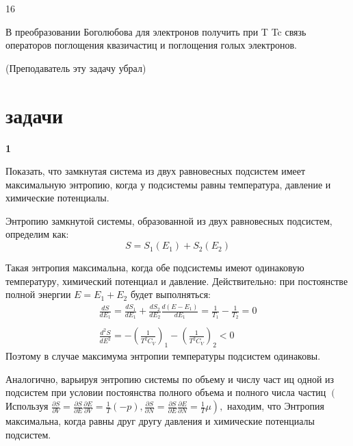\documentclass[a4paper,12pt]{article} %
\begin{document}
\begin{task}

16

В преобразовании Боголюбова для электронов получить при T  Tc связь операторов поглощения квазичастиц и поглощения голых электронов.

(Преподаватель эту задачу убрал)












\end{task}



















\clearpage
\part{задачи}



\begin{ttask}\textbf{1}


Показать, что замкнутая система из двух равновесных подсистем имеет максимальную энтропию, 
когда у подсистемы равны температура, давление и химические потенциалы.


Энтропию замкнутой системы, образованной из двух равновесных подсистем, определим как:
$$
S=S_{1}\left(E_{1}\right)+S_{2}\left(E_{2}\right)
$$


Такая энтропия максимальна, когда обе подсистемы имеют одинаковую температуру, химический потенциал и давление.
Действительно:
при постоянстве полной энергии $E=E_{1}+E_{2}$ будет выполняться:
{\Large $$
	\begin{array}{c}
	\frac{d S}{d E_{1}}=\frac{d S_{1}}{d E_{1}}+\frac{d S_{2}}{d E_{2}} \frac{d\left(E-E_{1}\right)}{d E_{1}}=\frac{1}{T_{1}}-\frac{1}{T_{2}}=0 \\ \\
	\frac{d^{2} S}{d E^{2}}=-\left(\frac{1}{T^{2} C_{V}}\right)_{1}-\left(\frac{1}{T^{2} C_{V}}\right)_{2}<0
	\end{array}
	$$}
Поэтому в случае максимума энтропии температуры подсистем одинаковы.

Аналогично, варьируя энтропию системы по объему и числу част иц одной из подсистем при условии постоянства полного объема и полного числа частиц 
$\left(\right.$ Используя $\left.\frac{\partial S}{\partial V}=
\frac{\partial S}{\partial E} \frac{\partial E}{\partial V}=\frac{1}{T}(-p), \frac{\partial S}{\partial N}=
\frac{\partial S}{\partial E} \frac{\partial E}{\partial N}=
\frac{1}{T} \mu\right),$ находим, что Энтропия
максимальна, когда равны друг другу давления и химические потенциалы подсистем.



\end{ttask}
\end{document}
